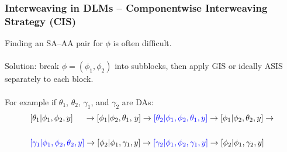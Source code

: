 \documentclass[xcolor=dvipsnames]{beamer}
\begin{document}
\begin{frame}
\frametitle{Interweaving in DLMs -- Componentwise Interweaving Strategy (CIS)}
Finding an SA--AA pair for $\phi$ is often difficult.\\~\\

Solution: break $\phi=(\phi_1,\phi_2)$ into subblocks, then apply GIS or ideally ASIS separately to each block.\\~\\

For example if $\theta_1$, $\theta_2$, $\gamma_1$, and $\gamma_2$ are DAs:\\

\begin{align*}
&[\theta_1|\phi_1,\phi_2,y]\phantom{\theta_2,}\hspace{.06cm} \to [\phi_1|\phi_2,\theta_1,\hspace{.05cm}y] \to {\color{blue}[\theta_2|\phi_1,\phi_2,\theta_1,y]} \to [\phi_1|\phi_2,\theta_2,y]\to\\
&\\
&{\color{blue}[\gamma_1|\phi_1,\phi_2,\theta_2,y]} \to [\phi_2|\phi_1,\gamma_1,y] \to {\color{blue}[\gamma_2|\phi_1,\phi_2,\gamma_1,y]} \to [\phi_2|\phi_1,\gamma_2,y]\\
\end{align*}

\end{frame}
\end{document}
